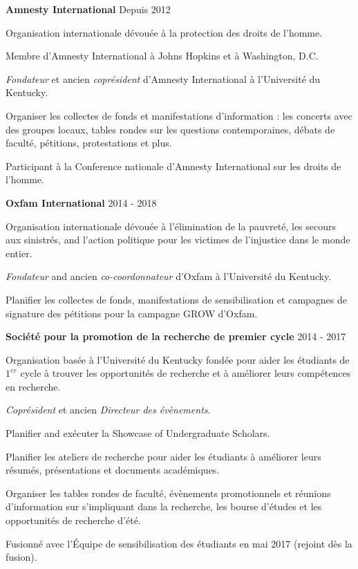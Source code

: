 \documentclass[10pt]{article}
\newcommand{\halfblankline}{\quad\vspace{-0.5\baselineskip}\pagebreak[3]}
\begin{document}
	\textbf{Amnesty International}
	\hfill Depuis 2012
	\begin{innerlist}
		\item Organisation internationale dévouée à la protection des droits de l'homme.
		\item Membre d'Amnesty International à Johns Hopkins et à Washington, D.C.
		\item \textit{Fondateur} et ancien \textit{coprésident} d'Amnesty International à l'Université du Kentucky.
		\item Organiser les collectes de fonds et manifestations d'information : les concerts avec des groupes locaux, tables rondes sur les questions contemporaines, débats de faculté, pétitions, protestations et plus.
		\item Participant à la Conference nationale d'Amnesty International sur les droits de l'homme.
	\end{innerlist}
	
	\halfblankline
	
	\textbf{Oxfam International}
	\hfill 2014 - 2018
	\begin{innerlist}
		\item Organisation internationale dévouée à l'élimination de la pauvreté, les secours aux sinistrés, and l'action politique pour les victimes de l'injustice dans le monde entier.
		\item \textit{Fondateur} and ancien \textit{co-coordonnateur} d'Oxfam à l'Université du Kentucky.
		\item Planifier les collectes de fonds, manifestations de sensibilisation et campagnes de signature des pétitions pour la campagne GROW d'Oxfam.
	\end{innerlist}

	\halfblankline
	
	\textbf{Société pour la promotion de la recherche de premier cycle}
	\hfill 2014 - 2017
	\begin{innerlist}
		\item Organisation basée à l'Université du Kentucky fondée pour aider les étudiants de $1^{er}$ cycle à trouver les opportunités de recherche  et à améliorer leurs compétences en recherche.
		\item \textit{Coprésident} et ancien \textit{Directeur des évènements}.
		\item Planifier and exécuter la Showcase of Undergraduate Scholars.
		\item Planifier les ateliers de recherche pour aider les étudiants à améliorer leurs résumés, présentations et documents académiques.
		\item Organiser les tables rondes de faculté, évènements promotionnels et réunions d'information sur s'impliquant dans la recherche, les bourse d'études et les opportunités de recherche d'été.
		\item Fusionné avec l'Équipe de sensibilisation des étudiants en mai 2017 (rejoint dès la fusion).
	\end{innerlist}
\end{document}
